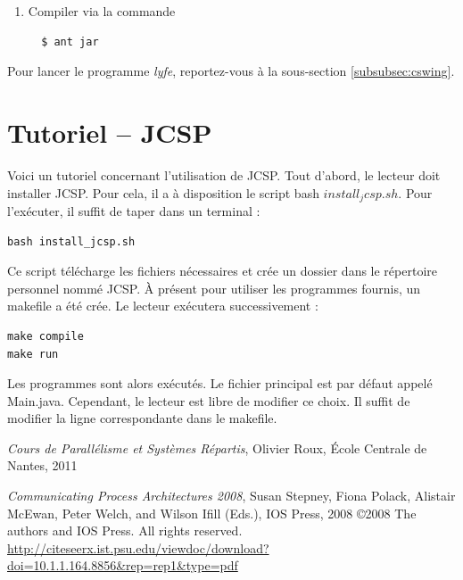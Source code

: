 \documentclass[a4paper,11pt,french]{report}
\begin{document}
\begin{enumerate}
  
\item Compiler via la commande
  \begin{verbatim} 
  $ ant jar
  \end{verbatim}  
\end{enumerate}

Pour lancer le programme \emph{lyfe}, reportez-vous à la sous-section \vref{subsubsec:cswing}.



\chapter[Tutoriel JCSP]{Tutoriel -- JCSP}

Voici un tutoriel concernant l'utilisation de JCSP. Tout d'abord, le lecteur doit installer JCSP. Pour cela, il a à disposition le script bash $install_jcsp.sh$. Pour l'exécuter, il suffit de taper dans un terminal :

\begin{lstlisting}[frame=trBL]
bash install_jcsp.sh
\end{lstlisting}

Ce script télécharge les fichiers nécessaires et crée un dossier dans le répertoire personnel nommé JCSP. \`A présent pour utiliser les programmes fournis, un makefile a été crée. Le lecteur exécutera successivement :

\begin{lstlisting}[frame=trBL]
make compile
make run
\end{lstlisting}

Les programmes sont alors exécutés. Le fichier principal est par défaut appelé Main.java. Cependant, le lecteur est libre de modifier ce choix. Il suffit de modifier la ligne correspondante dans le makefile.

\begin{thebibliography}{Cpa2008}
 {\textit{Cours de Parallélisme et Systèmes Répartis}, Olivier Roux, \'Ecole Centrale de Nantes, 2011}

 {\textit{Communicating Process Architectures 2008}, Susan Stepney, Fiona Polack, Alistair McEwan, Peter Welch, and Wilson Ifill (Eds.), IOS Press, 2008
\copyright 2008 The authors and IOS Press. All rights reserved.\\
\url{http://citeseerx.ist.psu.edu/viewdoc/download?doi=10.1.1.164.8856&rep=rep1&type=pdf}}
\end{thebibliography}
\end{document}
